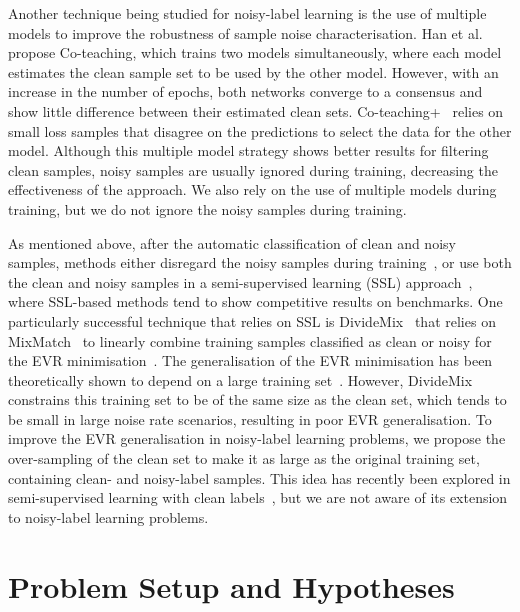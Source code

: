 \documentclass[review]{elsarticle}
\begin{document}
Another technique being studied for noisy-label learning is the use of multiple models to improve the robustness of sample noise characterisation. Han et al.~\cite{han2018co} propose Co-teaching, which trains two models simultaneously, where each model estimates the clean sample set to be used by the other model. However, with an increase in the number of epochs, both networks converge to a consensus and show little difference between their estimated clean sets. Co-teaching+~\cite{yu2019does} relies on small loss samples that disagree on the predictions to select the data for the other model. Although this multiple model strategy shows better results for filtering clean samples, noisy samples are usually ignored during training, decreasing the effectiveness of the approach. We also rely on the use of multiple models during training, but we do not ignore the noisy samples during training.

As mentioned above, after the automatic classification of clean and noisy samples, methods either disregard the noisy samples during training~\cite{thulasidasan2019combating, han2018co}, or use both the clean and noisy samples in a semi-supervised learning (SSL) approach~\cite{li2020dividemix, arazo2019unsupervised, sachdeva2021evidentialmix}, where SSL-based methods tend to show competitive results on benchmarks.
One particularly successful technique that relies on SSL is DivideMix~\cite{li2020dividemix} that relies on MixMatch~\cite{berthelot2019mixmatch} to linearly combine training samples classified as clean or noisy for the EVR minimisation~\cite{zhang2017mixup}.
The generalisation of the EVR minimisation has been theoretically shown to depend on a large training set~\cite{zhang2018generalization}.
However, DivideMix~\cite{li2020dividemix}
constrains this training set to be of the same size as the clean set, which tends to be small in large noise rate scenarios, resulting in poor EVR generalisation.
To improve the EVR generalisation in noisy-label learning problems, we propose the over-sampling of the clean set to make it as large as the original training set, containing clean- and noisy-label samples.
This idea has recently been explored in semi-supervised learning with clean labels~\cite{tarvainen2017mean, chen2018semi,iscen2019label,arazo2020pseudo}, but we are not aware of its extension to noisy-label learning problems.


\section{Problem Setup and Hypotheses}
\label{sec:problem_definition}
\end{document}
